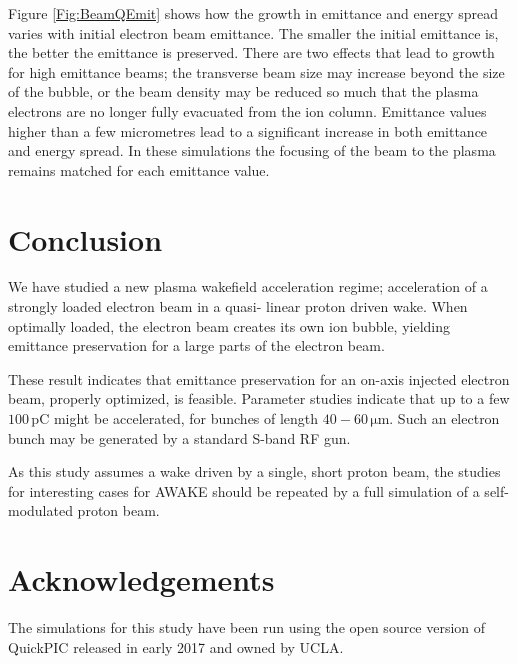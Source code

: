 \documentclass[aps,prstab,reprint,amsmath,amssymb,groupedaddress]{revtex4-1}
\newcommand{\unit}[1]{\,\mathrm{#1}}
\begin{document}
Figure \ref{Fig:BeamQEmit} shows how the growth in emittance and energy spread varies with initial electron beam
emittance. The smaller the initial emittance is, the better the emittance is preserved. There are two effects that lead
to growth for high emittance beams; the transverse beam size may increase beyond the size of the bubble, or the beam
density may be reduced so much that the plasma electrons are no longer fully evacuated from the ion column. Emittance
values higher than a few micrometres lead to a significant increase in both emittance and energy spread. In these
simulations the focusing of the beam to the plasma remains matched for each emittance value.

\section[\label{S:C}]{Conclusion}

We have studied a new plasma wakefield acceleration regime; acceleration of a strongly loaded electron beam in a quasi-
linear proton driven wake. When optimally loaded, the electron beam creates its own ion bubble, yielding emittance
preservation for a large parts of the electron beam.

These result indicates that emittance preservation for an on-axis injected electron beam, properly optimized, is
feasible. Parameter studies indicate that up to a few $100\unit{pC}$ might be accelerated, for bunches of length
$40-60\unit{\mu m}$. Such an electron bunch may be generated by a standard S-band RF gun.

As this study assumes a wake driven by a single, short proton beam, the studies for interesting cases for AWAKE should
be repeated by a full simulation of a self-modulated proton beam.

\section[\label{Ack}]{Acknowledgements}

The simulations for this study have been run using the open source version of QuickPIC released in early 2017 and owned
by UCLA.
\end{document}
